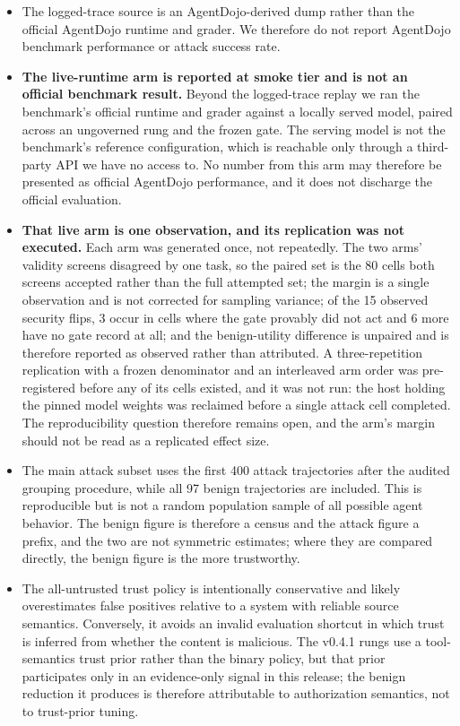 \documentclass[letterpaper,twocolumn,10pt]{article}
\begin{document}
\begin{itemize}

\item The logged-trace source is an AgentDojo-derived dump rather than the
official AgentDojo runtime and grader. We therefore do not report AgentDojo
benchmark performance or attack success rate.

\item \textbf{The live-runtime arm is reported at smoke tier and is not an
official benchmark result.} Beyond the logged-trace replay we ran the
benchmark's official runtime and grader against a locally served model, paired
across an ungoverned rung and the frozen gate. The serving model is not the
benchmark's reference configuration, which is reachable only through a
third-party API we have no access to. No number from this arm may therefore be
presented as official AgentDojo performance, and it does not discharge the
official evaluation.

\item \textbf{That live arm is one observation, and its replication was not
executed.} Each arm was generated once, not repeatedly. The two arms' validity
screens disagreed by one task, so the paired set is the 80 cells both screens
accepted rather than the full attempted set; the margin is a single observation
and is not corrected for sampling variance; of the 15 observed security flips, 3
occur in cells where the gate provably did not act and 6 more have no gate record
at all; and the benign-utility difference is unpaired and is therefore reported
as observed rather than attributed. A three-repetition replication with a frozen
denominator and an interleaved arm order was pre-registered before any of its
cells existed, and it was not run: the host holding the pinned model weights was
reclaimed before a single attack cell completed. The reproducibility question
therefore remains open, and the arm's margin should not be read as a replicated
effect size.

\item The main attack subset uses the first 400 attack trajectories after the
audited grouping procedure, while all 97 benign trajectories are included. This
is reproducible but is not a random population sample of all possible agent
behavior. The benign figure is therefore a census and the attack figure a
prefix, and the two are not symmetric estimates; where they are compared
directly, the benign figure is the more trustworthy.

\item The all-untrusted trust policy is intentionally conservative and likely
overestimates false positives relative to a system with reliable source
semantics. Conversely, it avoids an invalid evaluation shortcut in which trust
is inferred from whether the content is malicious. The v0.4.1 rungs use a
tool-semantics trust prior rather than the binary policy, but that prior
participates only in an evidence-only signal in this release; the benign
reduction it produces is therefore attributable to authorization semantics, not
to trust-prior tuning.


\end{itemize}
\end{document}
